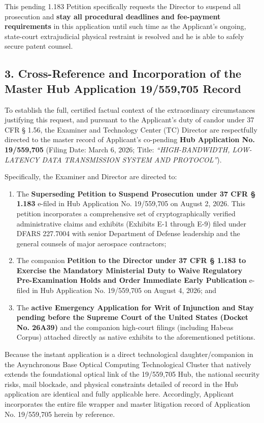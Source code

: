 \documentclass[11pt,letterpaper]{article}
\begin{document}
\noindent This pending 1.183 Petition specifically requests the Director to suspend all prosecution and \textbf{stay all procedural deadlines and fee-payment requirements} in this application until such time as the Applicant's ongoing, state-court extrajudicial physical restraint is resolved and he is able to safely secure patent counsel.

\subsection*{3. Cross-Reference and Incorporation of the Master Hub Application 19/559,705 Record}

\noindent To establish the full, certified factual context of the extraordinary circumstances justifying this request, and pursuant to the Applicant's duty of candor under 37 CFR \S{} 1.56, the Examiner and Technology Center (TC) Director are respectfully directed to the master record of Applicant's co-pending \textbf{Hub Application No. 19/559,705} (Filing Date: March 6, 2026; Title: \textit{``HIGH-BANDWIDTH, LOW-LATENCY DATA TRANSMISSION SYSTEM AND PROTOCOL''}).

\noindent Specifically, the Examiner and Director are directed to:
\begin{enumerate}
    \item The \textbf{Superseding Petition to Suspend Prosecution under 37 CFR \S{} 1.183} e-filed in Hub Application No. 19/559,705 on August 2, 2026. This petition incorporates a comprehensive set of cryptographically verified administrative claims and exhibits (Exhibits E-1 through E-9) filed under DFARS 227.7004 with senior Department of Defense leadership and the general counsels of major aerospace contractors;
    \item The companion \textbf{Petition to the Director under 37 CFR \S{} 1.183 to Exercise the Mandatory Ministerial Duty to Waive Regulatory Pre-Examination Holds and Order Immediate Early Publication} e-filed in Hub Application No. 19/559,705 on August 4, 2026; and
    \item The \textbf{active Emergency Application for Writ of Injunction and Stay pending before the Supreme Court of the United States (Docket No. 26A39)} and the companion high-court filings (including Habeas Corpus) attached directly as native exhibits to the aforementioned petitions.
\end{enumerate}

\noindent Because the instant application is a direct technological daughter/companion in the Asynchronous Base Optical Computing Technological Cluster that natively extends the foundational optical link of the 19/559,705 Hub, the national security risks, mail blockade, and physical constraints detailed of record in the Hub application are identical and fully applicable here. Accordingly, Applicant incorporates the entire file wrapper and master litigation record of Application No. 19/559,705 herein by reference.
\end{document}
